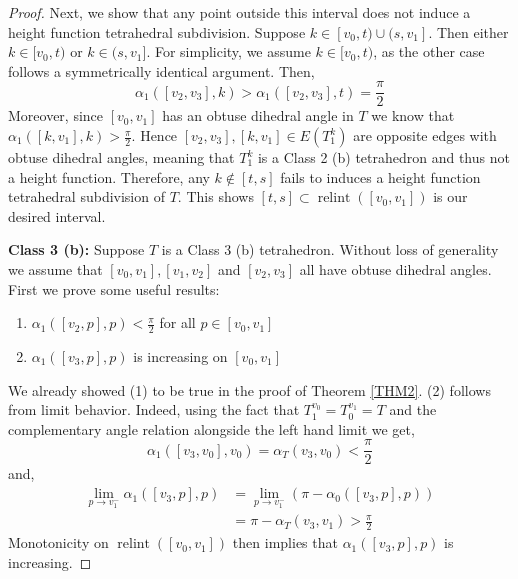 \documentclass{mainresearch}
\begin{document}
\begin{proof}
	Next, we show that any point outside this interval does not induce a height function tetrahedral subdivision. Suppose $ k\in [v_0,t)\cup (s,v_1]$. Then either $k \in [v_0,t)$ or $k \in (s,v_1]$. For simplicity, we assume $k \in [v_0,t)$, as the other case follows a symmetrically identical argument. Then,
	\begin{equation*}   
		\alpha_1([v_2,v_3],k) > \alpha_1([v_2,v_3],t) = \frac{\pi}{2}
	\end{equation*} 
	Moreover, since $[v_0,v_1]$ has an obtuse dihedral angle in $T$ we know that $\alpha_1([k,v_1],k) > \frac{\pi}{2}$. Hence $[v_2,v_3],[k,v_1] \in E(T_1^k)$ are opposite edges with obtuse dihedral angles, meaning that $T_1^k$ is a Class 2 (b) tetrahedron and thus not a height function. Therefore, any $k \notin [t,s]$ fails to induces a height function tetrahedral subdivision of $T$. This shows $[t,s]\subset \operatorname{relint}([v_0,v_1])$ is our desired interval.
	
	\bigskip
	
	\noindent\textbf{Class 3 (b):} Suppose $T$ is a Class 3 (b) tetrahedron. Without loss of generality we assume that $[v_0,v_1], [v_1,v_2]$ and $[v_2,v_3]$ all have obtuse dihedral angles. First we prove some useful results:
	
	\begin{enumerate}
		\item $\alpha_1([v_2,p],p) < \frac{\pi}{2}$ for all $p\in[v_0,v_1]$
		\item $\alpha_1([v_3,p],p)$ is increasing on $[v_0,v_1]$
		
		
	\end{enumerate}
	We already showed (1) to be true in the proof of Theorem \ref{THM2}.  (2) follows from limit behavior. Indeed, using the fact that $T_1^{v_0} =T_0^{v_1}=T$ and the complementary angle relation alongside the left hand limit we get,
	\[
	\alpha_1([v_3,v_0],v_0)=\alpha_T(v_3,v_0) < \frac{\pi}{2}
	\] 
	and,
	\begin{align*}
		\lim_{p\to v_1^-}\alpha_1([v_3,p],p) &= \lim_{p\to v_1^-} (\pi- \alpha_{0}([v_3,p], p))\\ &= \pi - \alpha_T(v_3,v_1) > \frac{\pi}{2}
	\end{align*}
	Monotonicity on $\operatorname{relint}([v_0,v_1])$ then implies that $\alpha_1([v_3,p],p)$ is increasing.
	

\end{proof}
\end{document}
